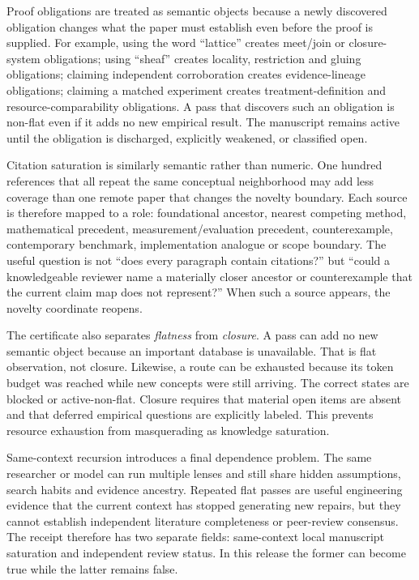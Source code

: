 Proof obligations are treated as semantic objects because a newly discovered obligation changes what the paper must establish even before the proof is supplied. For example, using the word ``lattice'' creates meet/join or closure-system obligations; using ``sheaf'' creates locality, restriction and gluing obligations; claiming independent corroboration creates evidence-lineage obligations; claiming a matched experiment creates treatment-definition and resource-comparability obligations. A pass that discovers such an obligation is non-flat even if it adds no new empirical result. The manuscript remains active until the obligation is discharged, explicitly weakened, or classified open.

Citation saturation is similarly semantic rather than numeric. One hundred references that all repeat the same conceptual neighborhood may add less coverage than one remote paper that changes the novelty boundary. Each source is therefore mapped to a role: foundational ancestor, nearest competing method, mathematical precedent, measurement/evaluation precedent, counterexample, contemporary benchmark, implementation analogue or scope boundary. The useful question is not ``does every paragraph contain citations?'' but ``could a knowledgeable reviewer name a materially closer ancestor or counterexample that the current claim map does not represent?'' When such a source appears, the novelty coordinate reopens.

The certificate also separates \emph{flatness} from \emph{closure}. A pass can add no new semantic object because an important database is unavailable. That is flat observation, not closure. Likewise, a route can be exhausted because its token budget was reached while new concepts were still arriving. The correct states are blocked or active-non-flat. Closure requires that material open items are absent and that deferred empirical questions are explicitly labeled. This prevents resource exhaustion from masquerading as knowledge saturation.

Same-context recursion introduces a final dependence problem. The same researcher or model can run multiple lenses and still share hidden assumptions, search habits and evidence ancestry. Repeated flat passes are useful engineering evidence that the current context has stopped generating new repairs, but they cannot establish independent literature completeness or peer-review consensus. The receipt therefore has two separate fields: same-context local manuscript saturation and independent review status. In this release the former can become true while the latter remains false.

